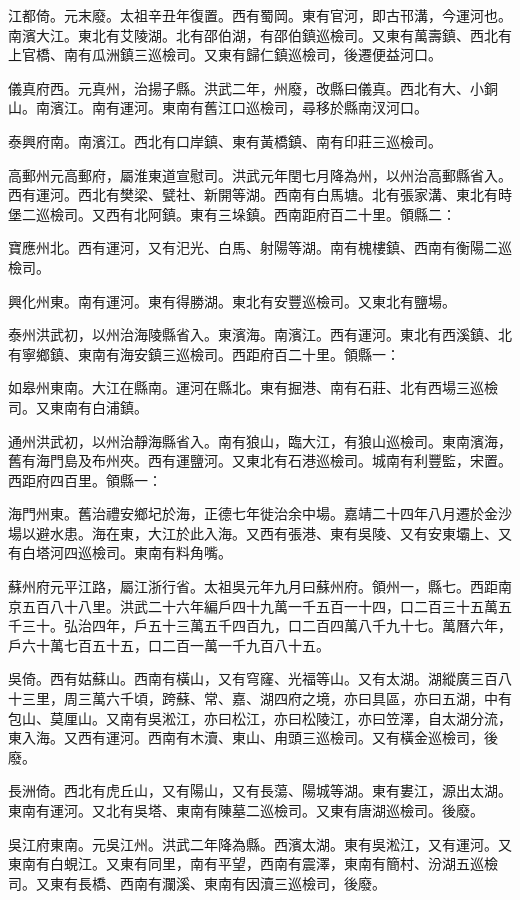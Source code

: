 江都倚。元末廢。太祖辛丑年復置。西有蜀岡。東有官河，即古邗溝，今運河也。南濱大江。東北有艾陵湖。北有邵伯湖，有邵伯鎮巡檢司。又東有萬壽鎮、西北有上官橋、南有瓜洲鎮三巡檢司。又東有歸仁鎮巡檢司，後遷便益河口。

儀真府西。元真州，治揚子縣。洪武二年，州廢，改縣曰儀真。西北有大、小銅山。南濱江。南有運河。東南有舊江口巡檢司，尋移於縣南汊河口。

泰興府南。南濱江。西北有口岸鎮、東有黃橋鎮、南有印莊三巡檢司。

高郵州元高郵府，屬淮東道宣慰司。洪武元年閏七月降為州，以州治高郵縣省入。西有運河。西北有樊梁、甓社、新開等湖。西南有白馬塘。北有張家溝、東北有時堡二巡檢司。又西有北阿鎮。東有三垛鎮。西南距府百二十里。領縣二：

寶應州北。西有運河，又有汜光、白馬、射陽等湖。南有槐樓鎮、西南有衡陽二巡檢司。

興化州東。南有運河。東有得勝湖。東北有安豐巡檢司。又東北有鹽場。

泰州洪武初，以州治海陵縣省入。東濱海。南濱江。西有運河。東北有西溪鎮、北有寧鄉鎮、東南有海安鎮三巡檢司。西距府百二十里。領縣一：

如皋州東南。大江在縣南。運河在縣北。東有掘港、南有石莊、北有西場三巡檢司。又東南有白浦鎮。

通州洪武初，以州治靜海縣省入。南有狼山，臨大江，有狼山巡檢司。東南濱海，舊有海門島及布州夾。西有運鹽河。又東北有石港巡檢司。城南有利豐監，宋置。西距府四百里。領縣一：

海門州東。舊治禮安鄉圮於海，正德七年徙治余中場。嘉靖二十四年八月遷於金沙場以避水患。海在東，大江於此入海。又西有張港、東有吳陵、又有安東壩上、又有白塔河四巡檢司。東南有料角嘴。

蘇州府元平江路，屬江浙行省。太祖吳元年九月曰蘇州府。領州一，縣七。西距南京五百八十八里。洪武二十六年編戶四十九萬一千五百一十四，口二百三十五萬五千三十。弘治四年，戶五十三萬五千四百九，口二百四萬八千九十七。萬曆六年，戶六十萬七百五十五，口二百一萬一千九百八十五。

吳倚。西有姑蘇山。西南有橫山，又有穹窿、光福等山。又有太湖。湖縱廣三百八十三里，周三萬六千頃，跨蘇、常、嘉、湖四府之境，亦曰具區，亦曰五湖，中有包山、莫厘山。又南有吳淞江，亦曰松江，亦曰松陵江，亦曰笠澤，自太湖分流，東入海。又西有運河。西南有木瀆、東山、甪頭三巡檢司。又有橫金巡檢司，後廢。

長洲倚。西北有虎丘山，又有陽山，又有長蕩、陽城等湖。東有婁江，源出太湖。東南有運河。又北有吳塔、東南有陳墓二巡檢司。又東有唐湖巡檢司。後廢。

吳江府東南。元吳江州。洪武二年降為縣。西濱太湖。東有吳淞江，又有運河。又東南有白蜆江。又東有同里，南有平望，西南有震澤，東南有簡村、汾湖五巡檢司。又東有長橋、西南有瀾溪、東南有因瀆三巡檢司，後廢。

